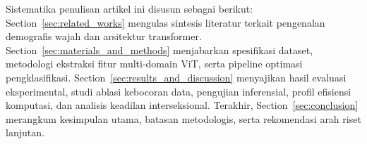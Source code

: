 Sistematika penulisan artikel ini disusun sebagai berikut: Section~\ref{sec:related_works} mengulas sintesis literatur terkait pengenalan demografis wajah dan arsitektur transformer. Section~\ref{sec:materials_and_methods} menjabarkan spesifikasi dataset, metodologi ekstraksi fitur multi-domain ViT, serta pipeline optimasi pengklasifikasi. Section~\ref{sec:results_and_discussion} menyajikan hasil evaluasi eksperimental, studi ablasi kebocoran data, pengujian inferensial, profil efisiensi komputasi, dan analisis keadilan interseksional. Terakhir, Section~\ref{sec:conclusion} merangkum kesimpulan utama, batasan metodologis, serta rekomendasi arah riset lanjutan.
